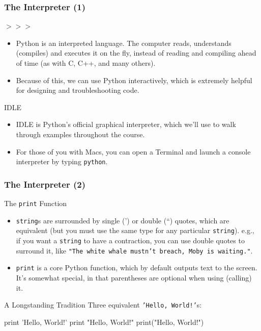 \documentclass[10pt]{beamer}
\begin{document}
\begin{frame}
  \frametitle{The Interpreter (1)}
  \begin{block}{$>>>$}
    \begin{itemize}
      \item Python is an interpreted language.
        The computer reads, understands (compiles) and executes it on the fly, instead of reading and compiling ahead of time (as with C, C++, and many others).
      \item Because of this, we can use Python interactively, which is extremely helpful for designing and troubleshooting code.
    \end{itemize}
  \end{block}
  \begin{block}{IDLE}
    \begin{itemize}
      \item IDLE is Python's official graphical interpreter, which we'll use to walk through examples throughout the course.
      \item For those of you with Macs, you can open a Terminal and launch a console interpreter by typing \texttt{python}.
    \end{itemize}
  \end{block}
\end{frame}

\begin{frame}[fragile]
  \frametitle{The Interpreter (2)}
  \begin{block}{The \texttt{print} Function}
    \begin{itemize}
      \item \texttt{string}s are surrounded by single (') or double (``) quotes, which are equivalent (but you must use the same type for any particular \texttt{string}).
        e.g., if you want a \texttt{string} to have a contraction, you can use double quotes to surround it, like \texttt{"The white whale mustn't breach, Moby is waiting."}.
      \item \texttt{print} is a core Python function, which by default outputs text to the screen. It's somewhat special, in that parentheses are optional when using (calling) it.
    \end{itemize}
  \end{block}
  \begin{block}{A Longstanding Tradition}
    Three equivalent \texttt{'Hello, World!'}s:
    \begin{pythoncode}
  print 'Hello, World!'
  print "Hello, World!"
  print("Hello, World!")
    \end{pythoncode}
  \end{block}
\end{frame}
\end{document}
